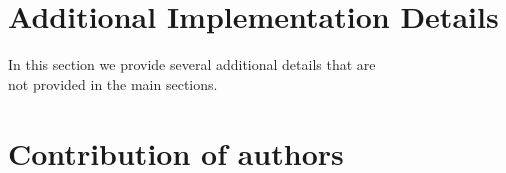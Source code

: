 \clearpage
\appendix
\onecolumn

\section{Additional Implementation Details}

In this section we provide several additional details that are\\
not provided in the main sections.


\section{Contribution of authors}
\label{subsec:membercontribution}
